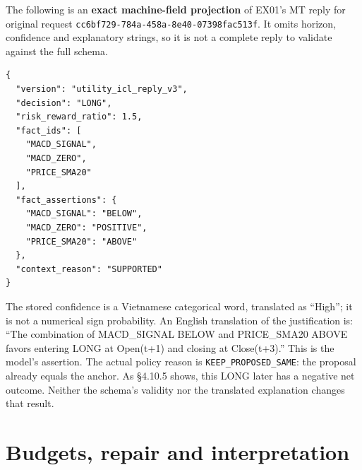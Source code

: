 The following is an \textbf{exact machine-field projection} of EX01's MT
reply for original request \texttt{cc6bf729-\allowbreak{}784a-\allowbreak{}458a-\allowbreak{}8e40-\allowbreak{}07398fac513f}.
It omits horizon, confidence and explanatory strings, so it is not a
complete reply to validate against the full schema.

\begin{Verbatim}[fontsize=\small,breaklines=true,breakanywhere=true]
{
  "version": "utility_icl_reply_v3",
  "decision": "LONG",
  "risk_reward_ratio": 1.5,
  "fact_ids": [
    "MACD_SIGNAL",
    "MACD_ZERO",
    "PRICE_SMA20"
  ],
  "fact_assertions": {
    "MACD_SIGNAL": "BELOW",
    "MACD_ZERO": "POSITIVE",
    "PRICE_SMA20": "ABOVE"
  },
  "context_reason": "SUPPORTED"
}
\end{Verbatim}

The stored confidence is a Vietnamese categorical word, translated as
``High''; it is not a numerical sign probability. An English translation
of the justification is: ``The combination of MACD\_\allowbreak{}SIGNAL BELOW and
PRICE\_\allowbreak{}SMA20 ABOVE favors entering LONG at Open(t+1) and closing at
Close(t+3).'' This is the model's assertion. The actual policy reason is
\texttt{KEEP\_\allowbreak{}PROPOSED\_\allowbreak{}SAME}: the proposal already equals the anchor. As §4.10.5
shows, this LONG later has a negative net outcome. Neither the schema's
validity nor the translated explanation changes that result.

\section{Budgets, repair and interpretation}\label{s:cba9976a494d8758}

\begingroup
\small
{}
\setlength{\tabcolsep}{3pt}

